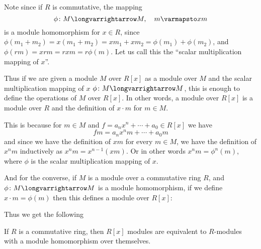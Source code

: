 \documentclass[10pt]{article}
\let\longto=\longvarrightarrow
\begin{document}
Note since if $R$ is commutative, the mapping
\[ \phi\colon M\longto M,\quad m\varmapsto xm \]
is a module homomorphism for $x\in R$, since $\phi(m_1+m_2)=x(m_1+m_2)=xm_1+xm_2=\phi(m_1)+\phi(m_2)$, and $\phi(rm)=xrm=rxm=r\phi(m)$.
Let us call this the ``scalar multiplication mapping of $x$''.

Thus if we are given a module $M$ over $R[x]$ as a module over $M$ and the scalar multiplication mapping of $x$ $\phi\colon M\longto M$, this is enough to define the operations of $M$ over $R[x]$.
In other words, a module over $R[x]$ is a module over $R$ and the definition of $x\cdot m$ for $m\in M$.

This is because for $m\in M$ and $f=a_nx^n+\cdots+a_0\in R[x]$ we have
\[ fm = a_nx^nm + \cdots + a_0m \]
and since we have the definition of $xm$ for every $m\in M$, we have the definition of $x^nm$ inductively as $x^nm=x^{n-1}(xm)$.
Or in other words $x^nm=\phi^n(m)$, where $\phi$ is the scalar multiplication mapping of $x$.

And for the converse, if $M$ is a module over a commutative ring $R$, and $\phi\colon M\longto M$ is a module homomorphism, if we define $x\cdot m=\phi(m)$ then this defines a module over $R[x]$:

Thus we get the following

\begin{prop*}

    If $R$ is a commutative ring, then $R[x]$ modules are equivalent to $R$-modules with a module homomorphism over themselves.

\end{prop*}
\end{document}
